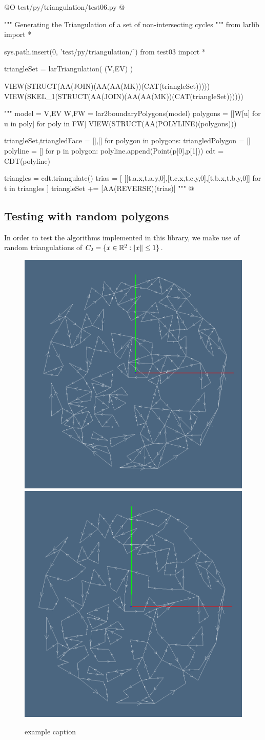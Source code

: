 \documentclass[11pt,oneside]{article}    %
\def\R{\mathbb{R}}
\begin{document}
@O test/py/triangulation/test06.py
@{""" Generating the Triangulation of a set of non-intersecting cycles """
from larlib import *

sys.path.insert(0, 'test/py/triangulation/')
from test03 import *

triangleSet = larTriangulation( (V,EV) )

VIEW(STRUCT(AA(JOIN)(AA(AA(MK))(CAT(triangleSet)))))
VIEW(SKEL_1(STRUCT(AA(JOIN)(AA(AA(MK))(CAT(triangleSet))))))

"""
model = V,EV
W,FW = lar2boundaryPolygons(model)
polygons = [[W[u] for u in poly] for poly in FW]
VIEW(STRUCT(AA(POLYLINE)(polygons)))

triangleSet,triangledFace = [],[]
for polygon in polygons:  
    triangledPolygon = []
    polyline = []
    for p in polygon:
        polyline.append(Point(p[0],p[1]))
    cdt = CDT(polyline)

    triangles = cdt.triangulate()
    trias = [ [[t.a.x,t.a.y,0],[t.c.x,t.c.y,0],[t.b.x,t.b.y,0]] for t in triangles ]
    triangleSet += [AA(REVERSE)(trias)]
"""
@}



\subsection{Testing with random polygons}

In order to test the algorithms implemented in this library, we make use of random triangulations of $C_2=\{x\in\R^2: \norm{x}\leq 1\}$.

\begin{figure}[htbp] %
   \centering
   \includegraphics[width=0.33\linewidth]{images/alg-tria0} 
   \includegraphics[width=0.33\linewidth]{images/alg-tria1} 
   \caption{example caption}
   \label{fig:example}
\end{figure}
\end{document}
